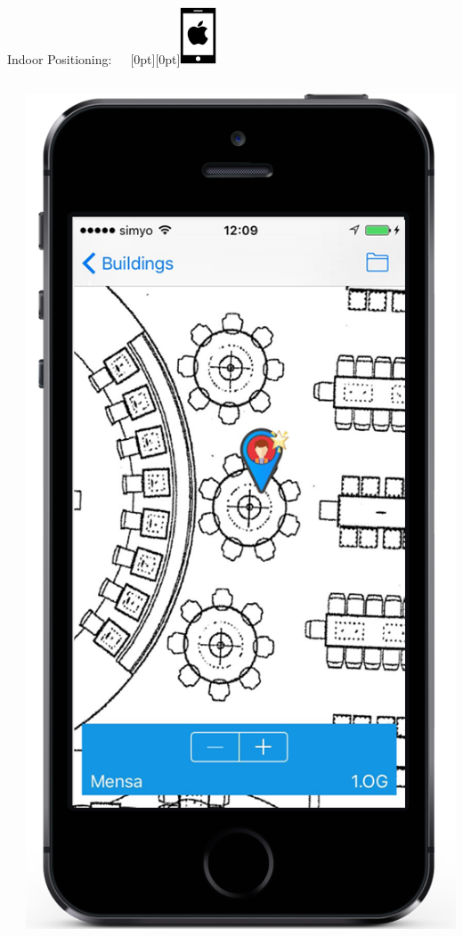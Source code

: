 \documentclass[11pt]{beamer}
\begin{document}
\begin{frame}{Indoor Positioning:~~~\raisebox{-10pt}[0pt][0pt]{\includegraphics[width=0.08\textwidth]{tech-stack-apple}}}
\begin{columns}[T]
\begin{column}{.6\textwidth}
\begin{itemize}
  \end{itemize}
  \end{column}
  \begin{column}{.4\textwidth}
  \includegraphics[scale=0.25]{mappinpointb}
  \end{column}
\end{columns}

\end{frame}
\end{document}

